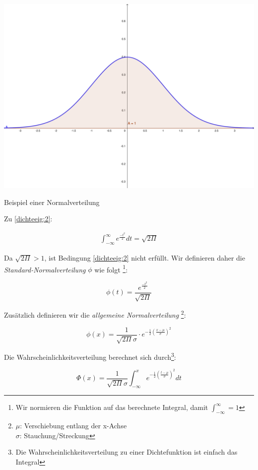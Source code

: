 \documentclass{tufte-handout}
\theoremstyle{own}
\begin{document}
\begin{marginfigure}
	\includegraphics{normalverteilung}
	\caption{Beispiel einer Normalverteilung}
\end{marginfigure}

Zu \eqref{dichteeig:2}:

\begin{gather*}
	\int_{-\infty}^\infty e^{\frac{- t^2}{2}} dt = \sqrt{2 \Pi}
\end{gather*}

Da $\sqrt{2\Pi} > 1$, ist Bedingung \eqref{dichteeig:2} nicht erfüllt. Wir definieren daher die \emph{Standard-Normalverteilung} $\phi$ wie folgt
\footnote{Wir normieren die Funktion auf das berechnete Integral, damit $\int_{-\infty}^\infty = 1$}:

\begin{equation}
\phi(t) = \frac{e^{\frac{-t^2}{2}}}{\sqrt{2 \Pi}}
\end{equation}

Zusätzlich definieren wir die \emph{allgemeine Normalverteilung}
\footnote{
$\mu$: Verschiebung entlang der x-Achse \\
$\sigma$: Stauchung/Streckung}:

\begin{equation}
\phi(x) = \frac{1}{\sqrt{2 \Pi} \sigma} \cdot e^{- \frac{1}{2} (\frac{x - \mu}{\sigma})^2}
\end{equation}

Die Wahrscheinlichkeitsverteilung berechnet sich durch\footnote{Die Wahrscheinlichkeitsverteilung zu einer Dichtefunktion ist einfach das Integral}:

\begin{equation}
\Phi(x) = \frac{1}{\sqrt{2 \Pi} \sigma} \int_{-\infty}^x e^{- \frac{1}{2} (\frac{t - \mu}{\sigma})^2} dt
\end{equation}
\end{document}
